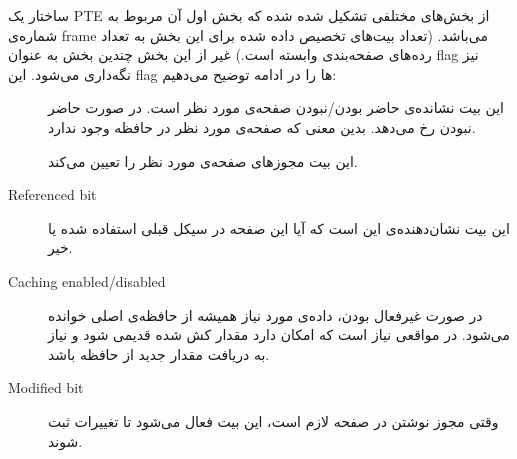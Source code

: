 ساختار یک PTE از بخش‌های مختلفی تشکیل شده شده که بخش اول آن مربوط به شماره‌ی frame می‌باشد. (تعداد بیت‌های تخصیص داده شده برای این بخش به تعداد‌ رده‌های صفحه‌بندی وابسته است.) غیر از این بخش چندین بخش به عنوان flag نیز نگه‌داری می‌شود. این flag ها را در ادامه توضیح می‌دهیم:

\begin{description}
	\item[] 
	این بیت نشانده‌ی حاضر بودن/نبودن صفحه‌ی مورد نظر است. در صورت حاضر نبودن 
	رخ می‌دهد. بدین معنی که صفحه‌ی مورد نظر در حافظه وجود ندارد.
	\item[] 
	این بیت مجوزهای صفحه‌ی مورد نظر را تعیین می‌کند. 
	\item[Referenced bit] 
	این بیت نشان‌دهنده‌ی این است که آیا این صفحه در سیکل قبلی استفاده شده یا خیر.
	\item[Caching enabled/disabled] 
	در صورت غیرفعال بودن، داده‌ی مورد نیاز همیشه از حافظه‌ی اصلی خوانده می‌شود. در مواقعی نیاز است که امکان دارد مقدار کش شده قدیمی شود و نیاز به دریافت مقدار جدید از حافظه باشد.
	\item[Modified bit] 
	وقتی مجوز نوشتن در صفحه لازم است، این بیت فعال می‌شود تا تغییرات ثبت شوند.
\end{description}